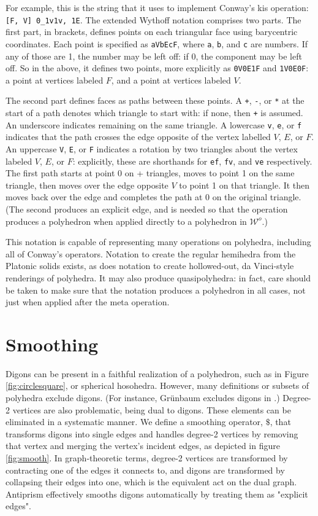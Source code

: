 \documentclass{amsart}[12pt]
\begin{document}
For example, this is the string that it uses to implement Conway's kis
operation: \texttt{[F, V] 0\_1v1v, 1E}. The extended Wythoff notation comprises
two parts. The first part, in brackets, defines points on each triangular face
using barycentric coordinates. Each point is specified as \texttt{aVbEcF}, where
\texttt{a}, \texttt{b}, and \texttt{c} are numbers. If any of those are 1, the
number may be left off: if 0, the component may be left off. So in the above,
it defines two points, more explicitly as \texttt{0V0E1F} and \texttt{1V0E0F}:
a point at vertices labeled $F$, and a point at vertices labeled $V$.

The second part defines faces as paths between these points. A \texttt{+},
\texttt{-}, or \texttt{*} at the start of a path denotes which triangle to
start with: if none, then \texttt{+} is assumed. An underscore indicates
remaining on the same triangle. A lowercase \texttt{v}, \texttt{e}, or
\texttt{f} indicates that the path crosses the edge opposite of the vertex
labelled $V$, $E$, or $F$. An uppercase \texttt{V}, \texttt{E}, or \texttt{F}
indicates a rotation by two triangles about the vertex labeled $V$, $E$, or $F$:
explicitly, these are shorthands for \texttt{ef}, \texttt{fv}, and \texttt{ve}
respectively. The first path starts at point 0 on + triangles, moves to point 1
on the same triangle, then moves over the edge opposite $V$ to point 1 on
that triangle. It then moves back over the edge and completes the path at 0
on the original triangle. (The second produces an explicit edge, and is needed
so that the operation produces a polyhedron when applied directly to a
polyhedron in $\mathcal{W}^o$.)

This notation is capable of representing many operations on polyhedra,
including all of Conway's operators. Notation to create the regular hemihedra
from the Platonic solids exists, as does notation to create hollowed-out,
da Vinci-style renderings of polyhedra. It may also produce quasipolyhedra: in
fact, care should be taken to make sure that the notation produces a polyhedron
in all cases, not just when applied after the meta operation.

\section{Smoothing}

Digons can be present in a faithful realization of a polyhedron, such as in
Figure \ref{fig:circlesquare}, or spherical hosohedra. However, many
definitions or subsets of polyhedra exclude digons. (For instance, Gr\"unbaum
excludes digons in \cite{grunbaum03}.) Degree-2 vertices are also problematic,
being dual to digons. These elements can be eliminated in a systematic manner.
We define a smoothing operator, $\$$, that transforms digons into single edges
and handles degree-2 vertices by removing that vertex and merging the vertex's
incident edges, as depicted in figure \ref{fig:smooth}. In graph-theoretic
terms, degree-2 vertices are transformed by contracting one of the edges it
connects to, and digons are transformed by collapsing their edges into one,
which is the equivalent act on the dual graph. \cite{gross} Antiprism
effectively smooths digons automatically by treating them as "explicit edges".
\end{document}
